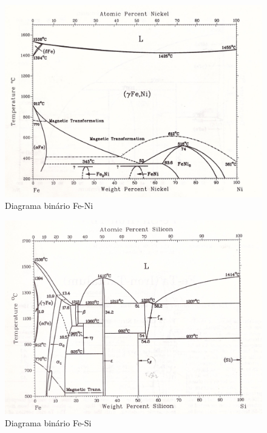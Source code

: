 \documentclass[brazil,tese,epusp]{usp}
\begin{document}
\begin{figure}
  \includegraphics[width=1.1\textwidth]{img/Fe-Ni.jpg}
  \caption{Diagrama binário Fe-Ni}
  \label{fig:bin_fe-ni}
\end{figure}

\begin{figure}
  \includegraphics[width=1.1\textwidth]{img/Fe-Si.jpg}
  \caption{Diagrama binário Fe-Si}
  \label{fig:bin_fe-si}
\end{figure}
\end{document}
